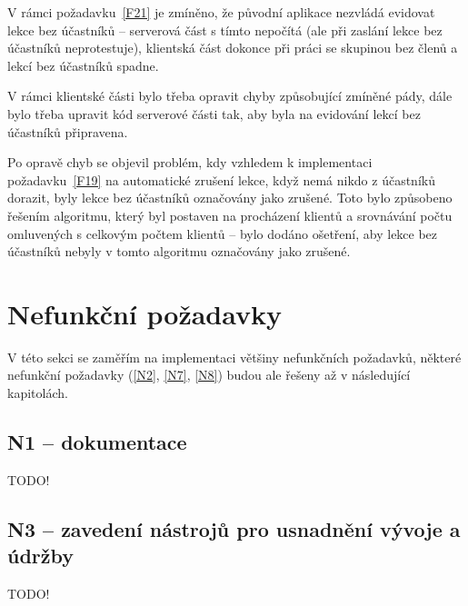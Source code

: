 V rámci požadavku~\ref{F21} je zmíněno, že původní aplikace nezvládá evidovat lekce bez účastníků -- serverová část s tímto nepočítá (ale při zaslání lekce bez účastníků neprotestuje), klientská část dokonce při práci se skupinou bez členů a lekcí bez účastníků spadne.

V rámci klientské části bylo třeba opravit chyby způsobující zmíněné pády, dále bylo třeba upravit kód serverové části tak, aby byla na evidování lekcí bez účastníků připravena.

Po opravě chyb se objevil problém, kdy vzhledem k implementaci požadavku~\ref{F19} na automatické zrušení lekce, když nemá nikdo z účastníků dorazit, byly lekce bez účastníků označovány jako zrušené. Toto bylo způsobeno řešením algoritmu, který byl postaven na procházení klientů a srovnávání počtu omluvených s celkovým počtem klientů -- bylo dodáno ošetření, aby lekce bez účastníků nebyly v tomto algoritmu označovány jako zrušené.

\section{Nefunkční požadavky}

V této sekci se zaměřím na implementaci většiny nefunkčních požadavků, některé nefunkční požadavky (\ref{N2}, \ref{N7}, \ref{N8}) budou ale řešeny až v následující kapitolách.

\subsection{N1 -- dokumentace}

TODO!

\subsection{N3 -- zavedení nástrojů pro usnadnění vývoje a údržby}

TODO!

